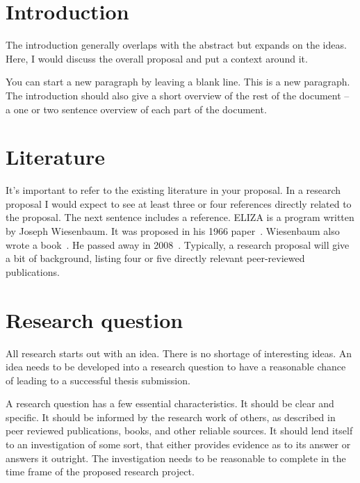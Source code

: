   \section{Introduction}
    The introduction generally overlaps with the abstract but expands
    on the ideas. Here, I would discuss the overall proposal and put a context
    around it.
    
    You can start a new paragraph by leaving a blank line. This is a new
    paragraph.
    The introduction should also give a short overview of the rest of the
    document -- a one or two sentence overview of each part of the document.

  \section{Literature}
    It's important to refer to the existing literature in your proposal. In a
    research proposal I would expect to see at least three or four references
    directly related to the proposal. The next sentence includes a reference.
    ELIZA is a program written by Joseph Wiesenbaum. It was proposed in his 1966
    paper~\cite{weisenbaumeliza}.
    Wiesenbaum also wrote a book~\cite{weisenbaumcomputerpower}.
    He passed away in 2008~\cite{weisenbaumnytobituary}.
    \label{section:literature}
    Typically, a research proposal will give a bit of background, listing four
    or five directly relevant peer-reviewed publications.

  \section{Research question}
    All research starts out with an idea. There is no shortage of interesting 
    ideas. An idea needs to be developed into a research question to have a
    reasonable chance of leading to a successful thesis submission.
    
    A research question has a few essential characteristics. It should be clear 
    and specific. It should be informed by the research work of others, as
    described in peer reviewed publications, books, and other reliable sources.
    It should lend itself to an investigation of some sort, that either provides
    evidence as to its answer or answers it outright. The investigation needs to
    be reasonable to complete in the time frame of the proposed research project.

